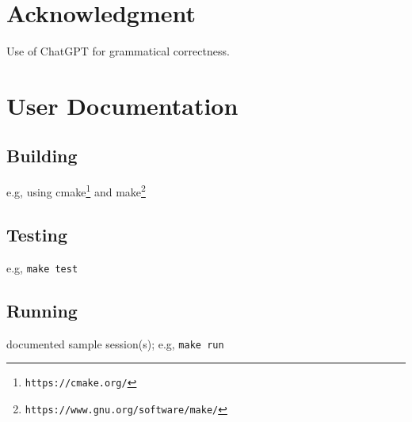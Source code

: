\documentclass{article}
\begin{document}
\section{Acknowledgment}

Use of ChatGPT for grammatical correctness.




\appendix

\section{User Documentation} \label{ch:userdoc}

\subsection{Building}

e.g, using cmake\footnote{\tt https://cmake.org/} and make\footnote{\tt https://www.gnu.org/software/make/}


\subsection{Testing}

e.g, \verb!make test!

\subsection{Running}

documented sample session(s); e.g, \verb!make run!
\end{document}
